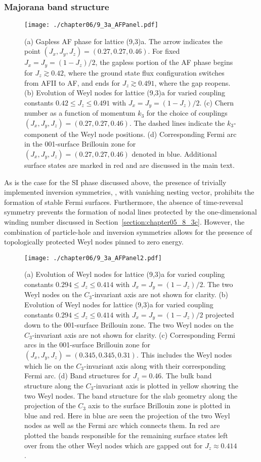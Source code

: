 \subsubsection{Majorana band structure}
%
%
%
\begin{figure}[tb]
	\centering
	\texttt{[image: ./chapter06/9\_3a\_AFPanel.pdf]}
	\caption{
		(a) Gapless AF phase for lattice (9,3)a.
		The arrow indicates the point $(J_x, J_y, J_z) = (0.27, 0.27, 0.46)$.
		For fixed $J_x = J_y = (1 - J_z)/2$, the gapless portion of the AF phase begins for $J_z \gtrsim 0.42$, where the ground state flux configuration switches from AFII to AF, and ends for $J_z \gtrsim 0.491$, where the gap reopens.
		(b) Evolution of Weyl nodes for lattice (9,3)a for varied coupling constants $0.42 \leq J_z \leq 0.491$ with $J_x = J_y = (1 - J_z)/2$.
		(c) Chern number as a function of momentum $k_3$ for the choice of couplings $(J_x, J_y, J_z) = (0.27, 0.27, 0.46)$.
		The dashed lines indicate the $k_3$-component of the Weyl node positions.
		(d) Corresponding Fermi arc in the 001-surface Brillouin zone for $(J_x, J_y, J_z) = (0.27, 0.27, 0.46)$ denoted in blue.
		Additional surface states are marked in red and are discussed in the main text.
	}
	\label{fig:chapter06_AFPanel}
\end{figure}
%
As is the case for the SI phase discussed above, the presence of trivially implemented inversion symmetries, \ie, with vanishing nesting vector, prohibits the formation of stable Fermi surfaces.
Furthermore, the absence of time-reversal symmetry prevents the formation of nodal lines protected by the one-dimensional winding number discussed in Section~\ref{section:chapter05_8_3c}.
However, the combination of particle-hole and inversion symmetries allows for the presence of topologically protected Weyl nodes pinned to zero energy.
%
\begin{figure}[tb]
	\centering
	\texttt{[image: ./chapter06/9\_3a\_AFPanel2.pdf]}
	\caption{
		(a) Evolution of Weyl nodes for lattice (9,3)a for varied coupling constants $0.294 \leq J_z \leq 0.414$ with $J_x = J_y = (1 - J_z)/2$.
		The two Weyl nodes on the $C_3$-invariant axis are not shown for clarity.
		(b) Evolution of Weyl nodes for lattice (9,3)a for varied coupling constants $0.294 \leq J_z \leq 0.414$ with $J_x = J_y = (1 - J_z)/2$ projected down to the 001-surface Brillouin zone.
		The two Weyl nodes on the $C_3$-invariant axis are not shown for clarity.
		(c) Corresponding Fermi arcs in the 001-surface Brillouin zone for $(J_x, J_y, J_z) = (0.345, 0.345, 0.31)$.
		This includes the Weyl nodes which lie on the $C_3$-invariant axis along with their corresponding Fermi arc.
		(d) Band structures for $J_z = 0.46$.
		The bulk band structure along the $C_3$-invariant axis is plotted in yellow showing the two Weyl nodes.
		The band structure for the slab geometry along the projection of the $C_3$ axis to the surface Brillouin zone is plotted in blue and red.
		Here in blue are seen the projection of the two Weyl nodes as well as the Fermi arc which connects them.
		In red are plotted the bands responsible for the remaining surface states left over from the other Weyl nodes which are gapped out for $J_z \approx 0.414$.
	}
	\label{fig:chapter06_AFPanel2}
\end{figure}
%

